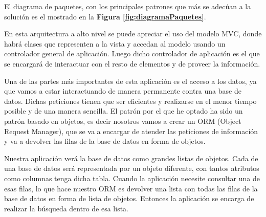 El diagrama de paquetes, con los principales patrones que más se adecúan a la solución es el mostrado en la \textbf{Figura \ref{fig:diagramaPaquetes}}.

En esta arquitectura a alto nivel se puede apreciar el uso del modelo MVC, donde habrá clases que representen a la vista y accedan al modelo usando un controlador general de aplicación. Luego dicho controlador de aplicación es el que se encargará de interactuar con el resto de elementos y de proveer la información. 

Una de las partes más importantes de esta aplicación es el acceso a los datos, ya que vamos a estar interactuando de manera permanente contra una base de datos. Dichas peticiones tienen que ser eficientes y realizarse en el menor tiempo posible y de una manera sencilla. El patrón por el que he optado ha sido un patrón basado en objetos, es decir nosotros vamos a crear un ORM (Object Request Manager), que se va a encargar de atender las peticiones de información y va a devolver las filas de la base de datos en forma de objetos. 

Nuestra aplicación verá la base de datos como grandes listas de objetos. Cada de una base de datos será representada por un objeto diferente, con tantos atributos como columnas tenga dicha tabla. Cuando la aplicación necesite consultar una de esas filas, lo que hace nuestro ORM es devolver una lista con todas las filas de la base de datos en forma de lista de objetos. Entonces la aplicación se encarga de realizar la búsqueda dentro de esa lista. 

